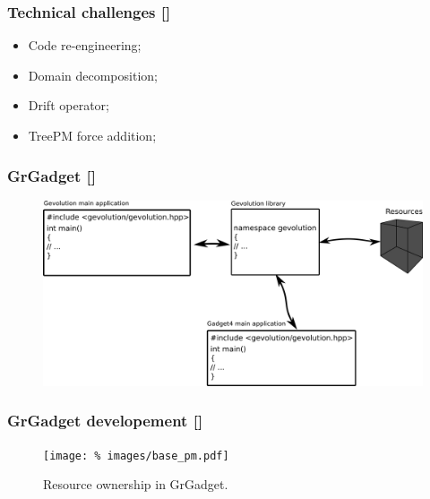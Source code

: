 \documentclass{beamer}
\makeatletter
\newcommand{\mylabel}{%
   [\beamer@againname]}
\makeatother
\begin{document}
\begin{frame}[plain,label=pmchart]
\begin{figure}
\begin{subfigure}[b]{.48\textwidth}
         \end{subfigure}
     \end{figure}
\end{frame}

\begin{frame}[label=challenges]
    \frametitle{Technical challenges\mylabel}
    \begin{itemize}
    	\setlength\itemsep{1em}
    	\item Code re-engineering;
	\item Domain decomposition;
	\item Drift operator;
	\item TreePM force addition;
    \end{itemize}
\end{frame}

\begin{frame}[label=codedesign]
    \frametitle{GrGadget\mylabel}
    \begin{figure}
        \includegraphics[width=\textwidth]{images/modular-code.png}
    \end{figure}
\end{frame}
\begin{frame}[label=memorylayout]
    \frametitle{GrGadget developement\mylabel}
    \vspace*{-.5cm}
    \begin{figure}
    \centering\texttt{[image: \%
        images/base\_pm.pdf]}%
        \caption{Resource ownership in GrGadget.}
    \end{figure}
\end{frame}
\end{document}
